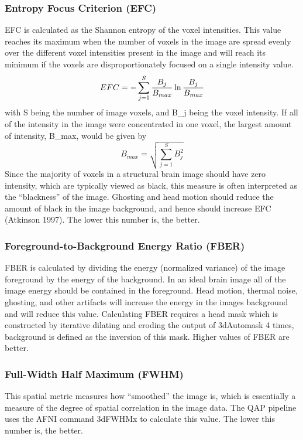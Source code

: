 \documentclass{frontiersSCNS} %
\begin{document}
\subsubsection{Entropy Focus Criterion (EFC)}
\label{sec:5}
EFC is calculated as the Shannon entropy of the voxel intensities. This value reaches its maximum when the number of voxels in the image are spread evenly over the different voxel intensities present in the image and will reach its minimum if the voxels are disproportionately focused on a single intensity value.
\begin{equation}
EFC = - \sum_{j=1}^{S} \frac{B_j}{B_{max}} \ln{\frac{B_j}{B_{max}}} \\
\end{equation}
with S being the number of image voxels, and B\_j being the voxel intensity. If all of the intensity in the image were concentrated in one voxel, the largest amount of intensity, B\_max, would be given by \\
\begin{equation}
B_{max} = \sqrt{\sum_{j=1}^{S} B_{j}^{2}}
\end{equation}
Since the majority of voxels in a structural brain image should have zero intensity, which are typically viewed as black, this measure is often interpreted as the “blackness” of the image. Ghosting and head motion should reduce the amount of black in the image background, and hence should increase EFC (Atkinson 1997). The lower this number is, the better. \\
\subsubsection{Foreground-to-Background Energy Ratio (FBER)}
\label{sec:6}
FBER is calculated by dividing the energy (normalized variance) of the image foreground by the energy of the background. In an ideal brain image all of the image energy should be contained in the foreground. Head motion, thermal noise, ghosting, and other artifacts will increase the energy in the images background and will reduce this value. Calculating FBER requires a head mask which is constructed by iterative dilating and eroding the output of 3dAutomask 4 times, background is defined as the inversion of this mask. Higher values of FBER are better. 
\subsubsection{Full-Width Half Maximum (FWHM)}
\label{sec:7}
This spatial metric measures how “smoothed” the image is, which is essentially a measure of the degree of spatial correlation in the image data. The QAP pipeline uses the AFNI command 3dFWHMx to calculate this value. The lower this number is, the better.
\end{document}
